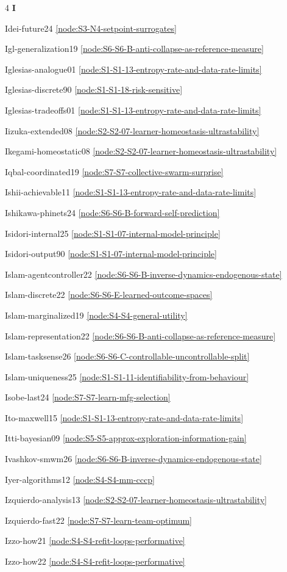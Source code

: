 \documentclass[10pt]{article}
\begin{document}
{\begin{multicols}{4}
\smallskip\textbf{I}\par
Idei-future24 \hfill \ref{node:S3-N4-setpoint-surrogates}\par
Igl-generalization19 \hfill \ref{node:S6-S6-B-anti-collapse-as-reference-measure}\par
Iglesias-analogue01 \hfill \ref{node:S1-S1-13-entropy-rate-and-data-rate-limits}\par
Iglesias-discrete90 \hfill \ref{node:S1-S1-18-risk-sensitive}\par
Iglesias-tradeoffs01 \hfill \ref{node:S1-S1-13-entropy-rate-and-data-rate-limits}\par
Iizuka-extended08 \hfill \ref{node:S2-S2-07-learner-homeostasis-ultrastability}\par
Ikegami-homeostatic08 \hfill \ref{node:S2-S2-07-learner-homeostasis-ultrastability}\par
Iqbal-coordinated19 \hfill \ref{node:S7-S7-collective-swarm-surprise}\par
Ishii-achievable11 \hfill \ref{node:S1-S1-13-entropy-rate-and-data-rate-limits}\par
Ishikawa-phinets24 \hfill \ref{node:S6-S6-B-forward-self-prediction}\par
Isidori-internal25 \hfill \ref{node:S1-S1-07-internal-model-principle}\par
Isidori-output90 \hfill \ref{node:S1-S1-07-internal-model-principle}\par
Islam-agentcontroller22 \hfill \ref{node:S6-S6-B-inverse-dynamics-endogenous-state}\par
Islam-discrete22 \hfill \ref{node:S6-S6-E-learned-outcome-spaces}\par
Islam-marginalized19 \hfill \ref{node:S4-S4-general-utility}\par
Islam-representation22 \hfill \ref{node:S6-S6-B-anti-collapse-as-reference-measure}\par
Islam-tasksense26 \hfill \ref{node:S6-S6-C-controllable-uncontrollable-split}\par
Islam-uniqueness25 \hfill \ref{node:S1-S1-11-identifiability-from-behaviour}\par
Isobe-last24 \hfill \ref{node:S7-S7-learn-mfg-selection}\par
Ito-maxwell15 \hfill \ref{node:S1-S1-13-entropy-rate-and-data-rate-limits}\par
Itti-bayesian09 \hfill \ref{node:S5-S5-approx-exploration-information-gain}\par
Ivashkov-smwm26 \hfill \ref{node:S6-S6-B-inverse-dynamics-endogenous-state}\par
Iyer-algorithms12 \hfill \ref{node:S4-S4-mm-cccp}\par
Izquierdo-analysis13 \hfill \ref{node:S2-S2-07-learner-homeostasis-ultrastability}\par
Izquierdo-fast22 \hfill \ref{node:S7-S7-learn-team-optimum}\par
Izzo-how21 \hfill \ref{node:S4-S4-refit-loops-performative}\par
Izzo-how22 \hfill \ref{node:S4-S4-refit-loops-performative}\par


\end{multicols}}
\end{document}
